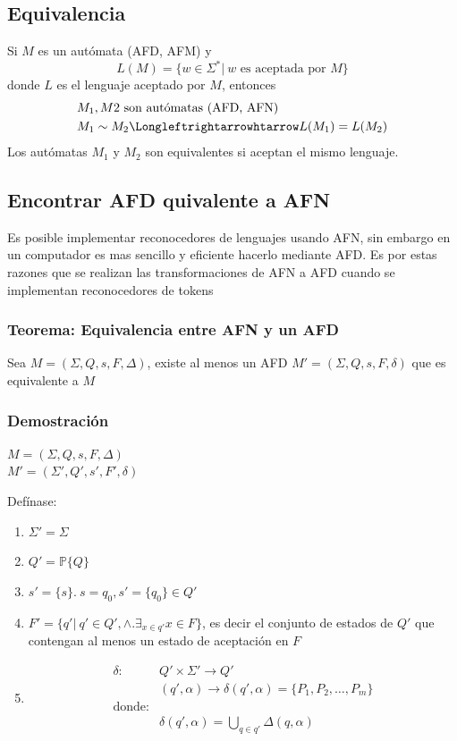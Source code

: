 \subsection{Equivalencia}

Si $M$ es un autómata (AFD, AFM) y
\begin{equation*}
    L(M)=\{w\in\Sigma^*\vert\: w \text{ es aceptada por } M\}
\end{equation*}
donde $L$ es el lenguaje aceptado por $M$, entonces 
\begin{align*}
    &M_1, M2\text{ son autómatas (AFD, AFN)}\\
    & M_1 \sim M_2 \Longleftrightarrowhtarrow L(M_1) = L(M_2)
\end{align*}
Los autómatas $M_1$ y $M_2$ son equivalentes si aceptan el mismo lenguaje.
\subsection{Encontrar AFD quivalente a AFN}

Es posible implementar reconocedores de lenguajes usando AFN, sin embargo en un computador es mas sencillo y eficiente hacerlo mediante AFD. Es por estas razones que se realizan las transformaciones de AFN a AFD cuando se implementan reconocedores de tokens 

\subsubsection*{Teorema: Equivalencia entre AFN y un AFD}
Sea $M=(\Sigma, Q, s, F, \Delta)$, existe al menos un AFD $M'=(\Sigma, Q, s, F, \delta)$ que es equivalente a $M$
\subsubsection*{Demostración}
$M=(\Sigma, Q, s, F, \Delta)$\\
$M'=(\Sigma', Q', s', F', \delta)$

Defínase:
\begin{enumerate}
    \item $\Sigma'=\Sigma$
    \item $Q'=\mathbb{P}\{Q\}$
    \item $s'=\{s\}.\:s=q_0, s'=\{q_0\}\in Q'$
    \item $F'=\{q'\vert\:q'\in Q',\wedge.\exists_{x\in q'}x \in F\}$, es decir el conjunto de estados de $Q'$ que contengan al menos un estado de aceptación en $F$
    \item \begin{align*}
        \delta:&Q'\times\Sigma'\rightarrow Q'\\
        &(q',\alpha)\rightarrow\delta(q',\alpha)=\{P_1, P_2,\dots,P_m\}\\
        \text{donde:}&\\
        &\delta(q',\alpha)=\bigcup_{q\in q'}\Delta(q,\alpha)
    \end{align*} 
    
    
\end{enumerate}

